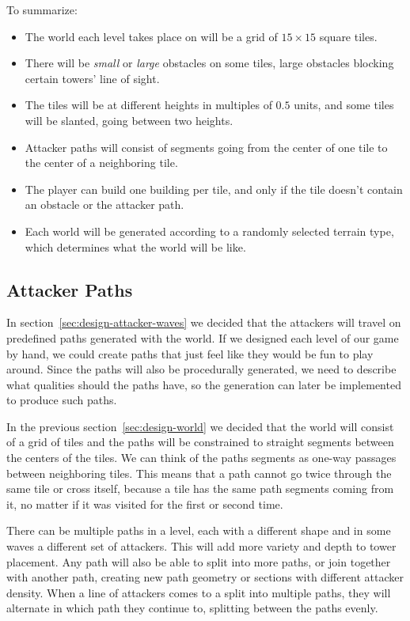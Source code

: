 To summarize:
\begin{itemize}
    \item The world each level takes place on will be a grid of $15 \times 15$ square tiles.
    \item There will be \emph{small} or \emph{large} obstacles on some tiles, large obstacles blocking certain towers' line of sight.
    \item The tiles will be at different heights in multiples of $0.5$ units, and some tiles will be slanted, going between two heights.
    \item Attacker paths will consist of segments going from the center of one tile to the center of a neighboring tile.
    \item The player can build one building per tile, and only if the tile doesn't contain an obstacle or the attacker path.
    \item Each world will be generated according to a randomly selected terrain type, which determines what the world will be like.
\end{itemize}

\subsection{Attacker Paths}

In section~\ref{sec:design-attacker-waves} we decided that the attackers will travel on predefined paths generated with the world.
If we designed each level of our game by hand, we could create paths that just feel like they would be fun to play around.
Since the paths will also be procedurally generated, we need to describe what qualities should the paths have, so the generation can later be implemented to produce such paths.

In the previous section~\ref{sec:design-world} we decided that the world will consist of a grid of tiles and the paths will be constrained to straight segments between the centers of the tiles.
We can think of the paths segments as one-way passages between neighboring tiles.
This means that a path cannot go twice through the same tile or cross itself, because a tile has the same path segments coming from it, no matter if it was visited for the first or second time.

There can be multiple paths in a level, each with a different shape and in some waves a different set of attackers.
This will add more variety and depth to tower placement.
Any path will also be able to split into more paths, or join together with another path, creating new path geometry or sections with different attacker density.
When a line of attackers comes to a split into multiple paths, they will alternate in which path they continue to, splitting between the paths evenly.

